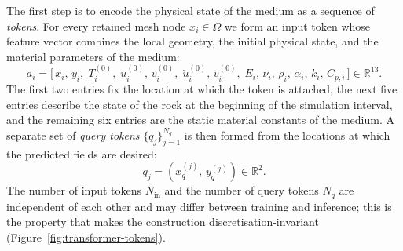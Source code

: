 The first step is to encode the physical state of the medium as a
sequence of \emph{tokens}. For every retained mesh node
\(x_i\in\Omega\) we form an input token whose feature vector
combines the local geometry, the initial physical state, and the
material parameters of the medium:
\begin{equation}
a_i =
\big[\,
  x_i,\,y_i,\;
  T_i^{(0)},\;
  u_i^{(0)},\,v_i^{(0)},\;
  \dot u_i^{(0)},\,\dot v_i^{(0)},\;
  E_i,\,\nu_i,\,\rho_i,\,\alpha_i,\,k_i,\,C_{p,i}
\,\big]\in\mathbb{R}^{13}.
\end{equation}
The first two entries fix the location at which the token is
attached, the next five entries describe the state of the rock at the
beginning of the simulation interval, and the remaining six entries are
the static material constants of the medium. A separate set of
\emph{query tokens} \(\{q_j\}_{j=1}^{N_q}\) is then formed from the
locations at which the predicted fields are desired:
\begin{equation}
q_j = (x_q^{(j)},\,y_q^{(j)})\in\mathbb{R}^{2}.
\end{equation}
The number of input tokens \(N_{\mathrm{in}}\) and the number of query
tokens \(N_q\) are independent of each other and may differ between
training and inference; this is the property that makes the
construction discretisation-invariant (Figure~\ref{fig:transformer-tokens}).

